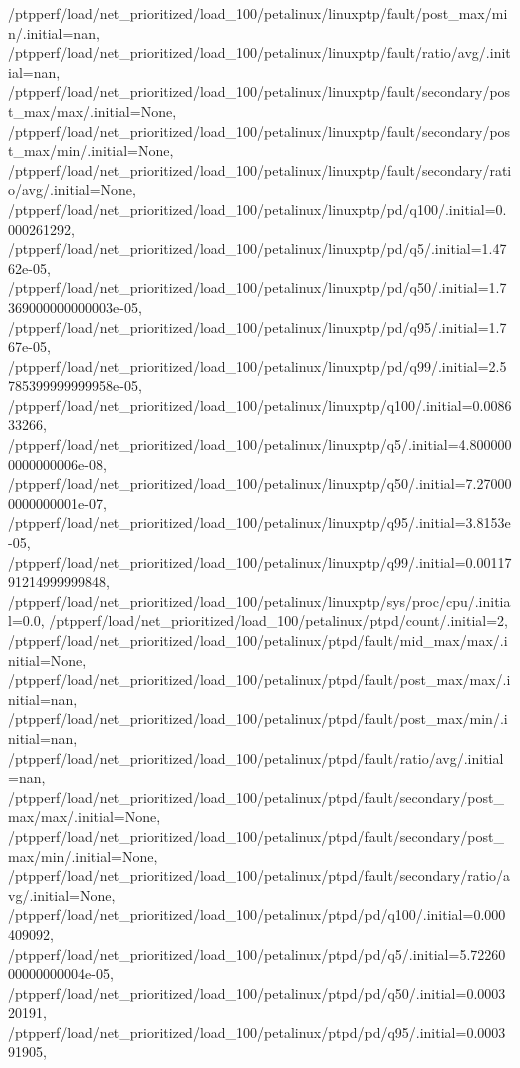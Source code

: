 {    /ptpperf/load/net_prioritized/load_100/petalinux/linuxptp/fault/post_max/min/.initial=nan,
    /ptpperf/load/net_prioritized/load_100/petalinux/linuxptp/fault/ratio/avg/.initial=nan,
    /ptpperf/load/net_prioritized/load_100/petalinux/linuxptp/fault/secondary/post_max/max/.initial=None,
    /ptpperf/load/net_prioritized/load_100/petalinux/linuxptp/fault/secondary/post_max/min/.initial=None,
    /ptpperf/load/net_prioritized/load_100/petalinux/linuxptp/fault/secondary/ratio/avg/.initial=None,
    /ptpperf/load/net_prioritized/load_100/petalinux/linuxptp/pd/q100/.initial=0.000261292,
    /ptpperf/load/net_prioritized/load_100/petalinux/linuxptp/pd/q5/.initial=1.4762e-05,
    /ptpperf/load/net_prioritized/load_100/petalinux/linuxptp/pd/q50/.initial=1.7369000000000003e-05,
    /ptpperf/load/net_prioritized/load_100/petalinux/linuxptp/pd/q95/.initial=1.767e-05,
    /ptpperf/load/net_prioritized/load_100/petalinux/linuxptp/pd/q99/.initial=2.5785399999999958e-05,
    /ptpperf/load/net_prioritized/load_100/petalinux/linuxptp/q100/.initial=0.008633266,
    /ptpperf/load/net_prioritized/load_100/petalinux/linuxptp/q5/.initial=4.8000000000000006e-08,
    /ptpperf/load/net_prioritized/load_100/petalinux/linuxptp/q50/.initial=7.270000000000001e-07,
    /ptpperf/load/net_prioritized/load_100/petalinux/linuxptp/q95/.initial=3.8153e-05,
    /ptpperf/load/net_prioritized/load_100/petalinux/linuxptp/q99/.initial=0.0011791214999999848,
    /ptpperf/load/net_prioritized/load_100/petalinux/linuxptp/sys/proc/cpu/.initial=0.0,
    /ptpperf/load/net_prioritized/load_100/petalinux/ptpd/count/.initial=2,
    /ptpperf/load/net_prioritized/load_100/petalinux/ptpd/fault/mid_max/max/.initial=None,
    /ptpperf/load/net_prioritized/load_100/petalinux/ptpd/fault/post_max/max/.initial=nan,
    /ptpperf/load/net_prioritized/load_100/petalinux/ptpd/fault/post_max/min/.initial=nan,
    /ptpperf/load/net_prioritized/load_100/petalinux/ptpd/fault/ratio/avg/.initial=nan,
    /ptpperf/load/net_prioritized/load_100/petalinux/ptpd/fault/secondary/post_max/max/.initial=None,
    /ptpperf/load/net_prioritized/load_100/petalinux/ptpd/fault/secondary/post_max/min/.initial=None,
    /ptpperf/load/net_prioritized/load_100/petalinux/ptpd/fault/secondary/ratio/avg/.initial=None,
    /ptpperf/load/net_prioritized/load_100/petalinux/ptpd/pd/q100/.initial=0.000409092,
    /ptpperf/load/net_prioritized/load_100/petalinux/ptpd/pd/q5/.initial=5.7226000000000004e-05,
    /ptpperf/load/net_prioritized/load_100/petalinux/ptpd/pd/q50/.initial=0.000320191,
    /ptpperf/load/net_prioritized/load_100/petalinux/ptpd/pd/q95/.initial=0.000391905,
}
